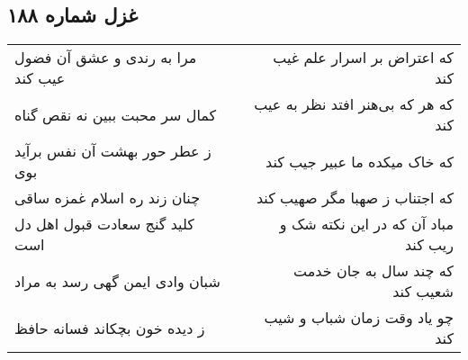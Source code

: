 \begin{center}
\section*{غزل شماره ۱۸۸}
\label{sec:sh188}
\begin{longtable}{l p{0.5cm} r}
مرا به رندی و عشق آن فضول عیب کند
&&
که اعتراض بر اسرار علم غیب کند
\\
کمال سر محبت ببین نه نقص گناه
&&
که هر که بی‌هنر افتد نظر به عیب کند
\\
ز عطر حور بهشت آن نفس برآید بوی
&&
که خاک میکده ما عبیر جیب کند
\\
چنان زند ره اسلام غمزه ساقی
&&
که اجتناب ز صهبا مگر صهیب کند
\\
کلید گنج سعادت قبول اهل دل است
&&
مباد آن که در این نکته شک و ریب کند
\\
شبان وادی ایمن گهی رسد به مراد
&&
که چند سال به جان خدمت شعیب کند
\\
ز دیده خون بچکاند فسانه حافظ
&&
چو یاد وقت زمان شباب و شیب کند
\\
\end{longtable}
\end{center}
